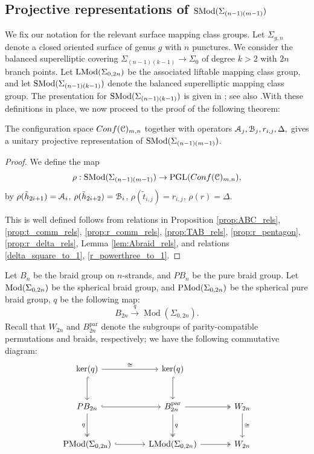 \documentclass{amsart}
\begin{document}
\subsection{Projective representations of $\SMod(\Sigma_{(n-1)(m-1)})$}

We fix our notation for the relevant surface mapping class groups. Let $\Sigma_{g,n}$ denote a closed oriented surface of genus $g$ with $n$ punctures. We consider the balanced superelliptic covering $\Sigma_{(n-1)(k-1)} \to \Sigma_0$ of degree $k > 2$ with $2n$ branch points. Let $\LMod(\Sigma_{0,2n})$ be the associated liftable mapping class group, and let $\SMod(\Sigma_{(n-1)(k-1)})$ denote the balanced superelliptic mapping class group. The presentation for $\SMod(\Sigma_{(n-1)(k-1)})$ is given in \cite[Thm.~6.12]{HO25}; see also \cite{GW17lifting, GW17blifting}.With these definitions in place, we now proceed to the proof of the following theorem:

\begin{Thm}\label{thm:Smod_rep}
 The configuration space $Conf(\CC)_{m,n}$ together with operators $\AA_j, \BB_j,  r_{i,j},\Delta,$ gives a unitary projective representation of $\SMod(\Sigma_{(n-1)(m-1)})$.    
\end{Thm}

\begin{proof}
We define the map
\[
\rho:\SMod(\Sigma_{(n-1)(m-1)})\to \PGL(Conf(\CC)_{m,n}),
\]
by $\rho(\tilde{h}_{2i+1})=\AA_i$, $\rho(\tilde{h}_{2i+2})=\BB_i$, $\rho(\tilde{t}_{i,j})=r_{i,j}$, $\rho(r)=\Delta$.

This is well defined follows from relations in Proposition \ref{prop:ABC_rels},\ref{prop:t_comm_rels}, \ref{prop:r_comm_rels}, \ref{prop:TAB_rels},  \ref{prop:r_pentagon}, \ref{prop:r_delta_rels}, Lemma \ref{lem:Abraid_rels}, and relations \eqref{delta_square_to_1}, \eqref{r_powerthree_to_1}. 
\end{proof}

Let $B_n$ be the braid group on $n$-strands, and $PB_n$ be the pure braid group. Let $\Mod(\Sigma_{0,2n})$ be the spherical braid group, and $\PMod(\Sigma_{0,2n})$ be the spherical pure braid group, $q$ be the following map:
\begin{equation}
    B_{2n}\xrightarrow[]{q}\operatorname{Mod}(\Sigma_{0,2n}).
\end{equation}
Recall that \(W_{2n}\) and \(B_{2n}^{\mathrm{par}}\) denote the subgroups of parity-compatible permutations and braids, respectively; we have the following commutative diagram:
\[
\begin{tikzcd}[row sep=large, column sep=large]
\ker(q)
  \arrow[r, "\cong"] 
  \arrow[d, hook] 
&
\ker(q)
  \arrow[d, hook] 
&
\phantom{A_{13}}
\\
PB_{2n} 
  \arrow[r, hook ] 
  \arrow[d, two heads, "q"'] 
&
B_{2n}^{\mathrm{par}}
  \arrow[r, two heads ] 
  \arrow[d, two heads, "q"] 
&
W_{2n}
  \arrow[d, "\cong"]
\\
\operatorname{PMod(\Sigma_{0,2n})} 
  \arrow[r, hook] 
&
\LMod(\Sigma_{0,2n}) 
  \arrow[r, two heads] 
&
W_{2n}
\end{tikzcd}
\]
\end{document}
